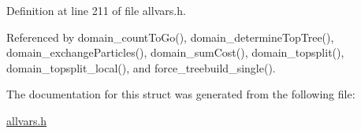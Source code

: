 Definition at line 211 of file allvars.h.



Referenced by domain\_\-countToGo(), domain\_\-determineTopTree(), domain\_\-exchangeParticles(), domain\_\-sumCost(), domain\_\-topsplit(), domain\_\-topsplit\_\-local(), and force\_\-treebuild\_\-single().



The documentation for this struct was generated from the following file:\begin{DoxyCompactItemize}
\item 
\hyperlink{allvars_8h}{allvars.h}\end{DoxyCompactItemize}
